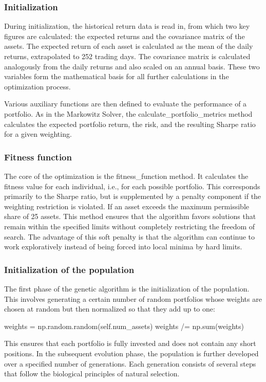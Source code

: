\documentclass{agasthesis}
\begin{document}
\subsubsection{Initialization}
During initialization, the historical return data is read in, from which two key figures are calculated: the expected returns and the covariance matrix of the assets. 
The expected return of each asset is calculated as the mean of the daily returns, extrapolated to 252 trading days. The covariance matrix is calculated analogously from 
the daily returns and also scaled on an annual basis. These two variables form the mathematical basis for all further calculations in the optimization process.

Various auxiliary functions are then defined to evaluate the performance of a portfolio. As in the Markowitz Solver, the calculate_portfolio_metrics method calculates the 
expected portfolio return, the risk, and the resulting Sharpe ratio for a given weighting.
\subsubsection{Fitness function}
The core of the optimization is the fitness_function method. It calculates the fitness value for each individual, i.e., for each possible portfolio. 
This corresponds primarily to the Sharpe ratio, but is supplemented by a penalty component if the weighting restriction is violated. If an asset exceeds 
the maximum permissible share of 25%
assets. This method ensures that the algorithm favors solutions that remain within the specified limits without completely restricting the freedom of search. The advantage of this 
soft penalty is that the algorithm can continue to work exploratively instead of being forced into local minima by hard limits.
\subsubsection{Initialization of the population}
The first phase of the genetic algorithm is the initialization of the population. This involves generating a certain number of random portfolios whose weights are chosen at random but then normalized so that they add up to one:

weights = np.random.random(self.num_assets)
weights /= np.sum(weights)

This ensures that each portfolio is fully invested and does not contain any short positions. In the subsequent evolution phase, the population is further developed over a specified number of generations. Each generation consists of several steps that follow the biological principles of natural selection.
\end{document}
